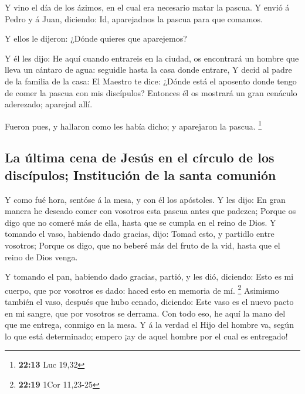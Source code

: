  Y vino el día de los ázimos, en el cual era necesario
matar la pascua.  Y envió á Pedro y á Juan, diciendo: Id,
aparejadnos la pascua para que comamos.

 Y ellos le dijeron: ¿Dónde quieres que aparejemos?

 Y él les dijo: He aquí cuando entrareis en la ciudad, os
encontrará un hombre que lleva un cántaro de agua: seguidle hasta la
casa donde entrare,  Y decid al padre de la familia de la
casa: El Maestro te dice: ¿Dónde está el aposento donde tengo de comer
la pascua con mis discípulos?  Entonces él os mostrará un
gran cenáculo aderezado; aparejad allí.

 Fueron pues, y hallaron como les había dicho; y
aparejaron la pascua. \footnote{\textbf{22:13} Luc 19,32}

\hypertarget{la-uxfaltima-cena-de-jesuxfas-en-el-cuxedrculo-de-los-discuxedpulos-instituciuxf3n-de-la-santa-comuniuxf3n}{%
\subsection{La última cena de Jesús en el círculo de los discípulos;
Institución de la santa
comunión}\label{la-uxfaltima-cena-de-jesuxfas-en-el-cuxedrculo-de-los-discuxedpulos-instituciuxf3n-de-la-santa-comuniuxf3n}}

 Y como fué hora, sentóse á la mesa, y con él los
apóstoles.  Y les dijo: En gran manera he deseado comer
con vosotros esta pascua antes que padezca;  Porque os
digo que no comeré más de ella, hasta que se cumpla en el reino de Dios.
 Y tomando el vaso, habiendo dado gracias, dijo: Tomad
esto, y partidlo entre vosotros;  Porque os digo, que no
beberé más del fruto de la vid, hasta que el reino de Dios venga.

 Y tomando el pan, habiendo dado gracias, partió, y les
dió, diciendo: Esto es mi cuerpo, que por vosotros es dado: haced esto
en memoria de mí. \footnote{\textbf{22:19} 1Cor 11,23-25}
 Asimismo también el vaso, después que hubo cenado,
diciendo: Este vaso es el nuevo pacto en mi sangre, que por vosotros se
derrama.  Con todo eso, he aquí la mano del que me
entrega, conmigo en la mesa.  Y á la verdad el Hijo del
hombre va, según lo que está determinado; empero ¡ay de aquel hombre por
el cual es entregado!

